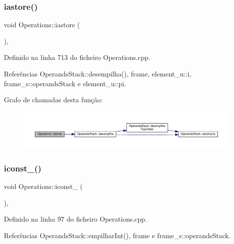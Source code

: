 \subsubsection{\texorpdfstring{iastore()}{iastore()}}
{\footnotesize\ttfamily void Operations\+::iastore (\begin{DoxyParamCaption}{ }\end{DoxyParamCaption})\hspace{0.3cm}{\ttfamily [static]}, {\ttfamily [private]}}



Definido na linha 713 do ficheiro Operations.\+cpp.



Referências Operands\+Stack\+::desempilha(), frame, element\+\_\+u\+::i, frame\+\_\+s\+::operands\+Stack e element\+\_\+u\+::pi.

Grafo de chamadas desta função\+:\nopagebreak
\begin{figure}[H]
\begin{center}
\leavevmode
\includegraphics[width=350pt]{classOperations_aeec162356a6792b1d0ba385f75f443b1_cgraph}
\end{center}
\end{figure}
\mbox{\label{classOperations_a89879486791daebe6659b96688465c9d}} 
\subsubsection{\texorpdfstring{iconst\+\_()}{iconst\_0()}}
{\footnotesize\ttfamily void Operations\+::iconst\+\_ (\begin{DoxyParamCaption}{ }\end{DoxyParamCaption})\hspace{0.3cm}{\ttfamily [static]}, {\ttfamily [private]}}



Definido na linha 97 do ficheiro Operations.\+cpp.



Referências Operands\+Stack\+::empilhar\+Int(), frame e frame\+\_\+s\+::operands\+Stack.

